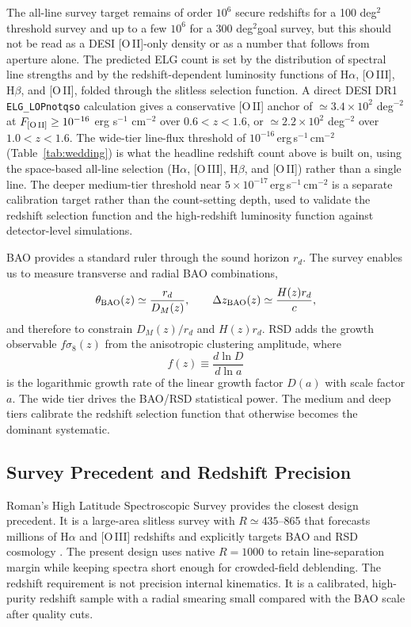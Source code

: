 \documentclass[10pt,onecolumn]{article}
\newcommand{\fsig}{f\sigma_8}
\newcommand{\degti}{deg$^2$}
\begin{document}
The all-line survey target remains of order $10^6$ secure redshifts for a 100 \degti threshold survey and up to a few $10^6$ for a 300 \degti goal survey, but this should not be read as a DESI [O\,II]-only density or as a number that follows from aperture alone. The predicted ELG count is set by the distribution of spectral line strengths and by the redshift-dependent luminosity functions of H$\alpha$, [O\,III], H$\beta$, and [O\,II], folded through the slitless selection function. A direct DESI DR1 \texttt{ELG\_LOPnotqso} calculation gives a conservative [O\,II] anchor of $\simeq3.4\times10^2$ deg$^{-2}$ at $F_{\rm [O\,II]}\ge10^{-16}$ erg s$^{-1}$ cm$^{-2}$ over $0.6<z<1.6$, or $\simeq2.2\times10^2$ deg$^{-2}$ over $1.0<z<1.6$. The wide-tier line-flux threshold of $10^{-16}$\,erg\,s$^{-1}$\,cm$^{-2}$ (Table~\ref{tab:wedding}) is what the headline redshift count above is built on, using the space-based all-line selection (H$\alpha$, [O\,III], H$\beta$, and [O\,II]) rather than a single line. The deeper medium-tier threshold near $5\times10^{-17}$\,erg\,s$^{-1}$\,cm$^{-2}$ is a separate calibration target rather than the count-setting depth, used to validate the redshift selection function and the high-redshift luminosity function against detector-level simulations.

BAO provides a standard ruler through the sound horizon $r_d$. The survey enables us to measure transverse and radial BAO combinations,
\begin{equation}
  \theta_{\rm BAO}(z)\simeq \frac{r_d}{D_M(z)}, \qquad
  \Delta z_{\rm BAO}(z)\simeq \frac{H(z)r_d}{c},
\end{equation}
and therefore to constrain $D_M(z)/r_d$ and $H(z)r_d$. RSD adds the growth observable $\fsig(z)$ from the anisotropic clustering amplitude, where
\begin{equation}
  f(z)\equiv\frac{d\ln D}{d\ln a}
\end{equation}
is the logarithmic growth rate of the linear growth factor $D(a)$ with scale factor $a$. The wide tier drives the BAO/RSD statistical power. The medium and deep tiers calibrate the redshift selection function that otherwise becomes the dominant systematic.

\subsection{Survey Precedent and Redshift Precision}

Roman's High Latitude Spectroscopic Survey provides the closest design precedent. It is a large-area slitless survey with $R\simeq435$--865 that forecasts millions of H$\alpha$ and [O\,III] redshifts and explicitly targets BAO and RSD cosmology \cite{wang2021}. The present design uses native $R=1000$ to retain line-separation margin while keeping spectra short enough for crowded-field deblending. The redshift requirement is not precision internal kinematics. It is a calibrated, high-purity redshift sample with a radial smearing small compared with the BAO scale after quality cuts.
\end{document}
